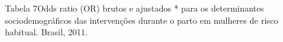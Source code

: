 \documentclass{article}
\begin{document}
Tabela 7Odds ratio (OR) brutos e ajustados * para os determinantes
sociodemográficos das intervenções durante o parto em mulheres de risco
habitual. Brasil, 2011.









\end{document}

